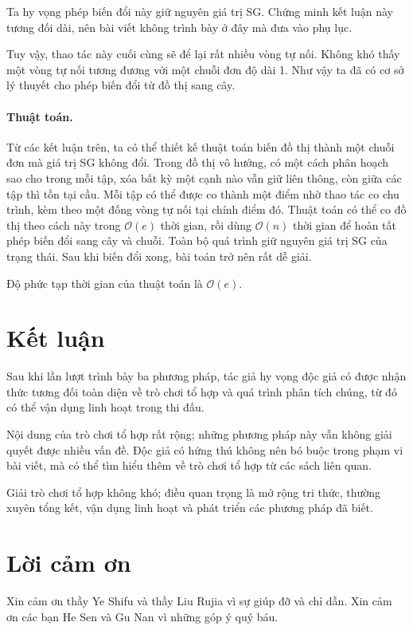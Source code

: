 \documentclass[11pt]{article}
\newcommand{\Oh}{\mathcal{O}}
\begin{document}
Ta hy vọng phép biến đổi này giữ nguyên giá trị SG. Chứng minh kết luận này
tương đối dài, nên bài viết không trình bày ở đây mà đưa vào phụ lục.

Tuy vậy, thao tác này cuối cùng sẽ để lại rất nhiều vòng tự nối. Không khó thấy
một vòng tự nối tương đương với một chuỗi đơn độ dài 1. Như vậy ta đã có cơ sở
lý thuyết cho phép biến đổi từ đồ thị sang cây.

\paragraph{Thuật toán.}
Từ các kết luận trên, ta có thể thiết kế thuật toán biến đồ thị thành một chuỗi
đơn mà giá trị SG không đổi. Trong đồ thị vô hướng, có một cách phân hoạch sao
cho trong mỗi tập, xóa bất kỳ một cạnh nào vẫn giữ liên thông, còn giữa các tập
thì tồn tại cầu. Mỗi tập có thể được co thành một điểm nhờ thao tác co chu
trình, kèm theo một đống vòng tự nối tại chính điểm đó. Thuật toán có thể co
đồ thị theo cách này trong \(\Oh(e)\) thời gian, rồi dùng \(\Oh(n)\) thời gian
để hoàn tất phép biến đổi sang cây và chuỗi. Toàn bộ quá trình giữ nguyên giá
trị SG của trạng thái. Sau khi biến đổi xong, bài toán trở nên rất dễ giải.

Độ phức tạp thời gian của thuật toán là \(\Oh(e)\).

\section{Kết luận}

Sau khi lần lượt trình bày ba phương pháp, tác giả hy vọng độc giả có được
nhận thức tương đối toàn diện về trò chơi tổ hợp và quá trình phân tích chúng,
từ đó có thể vận dụng linh hoạt trong thi đấu.

Nội dung của trò chơi tổ hợp rất rộng; những phương pháp này vẫn không giải
quyết được nhiều vấn đề. Độc giả có hứng thú không nên bó buộc trong phạm vi
bài viết, mà có thể tìm hiểu thêm về trò chơi tổ hợp từ các sách liên quan.

Giải trò chơi tổ hợp không khó; điều quan trọng là mở rộng tri thức, thường
xuyên tổng kết, vận dụng linh hoạt và phát triển các phương pháp đã biết.

\section*{Lời cảm ơn}

Xin cảm ơn thầy Ye Shifu và thầy Liu Rujia vì sự giúp đỡ và chỉ dẫn. Xin cảm
ơn các bạn He Sen và Gu Nan vì những góp ý quý báu.
\end{document}
